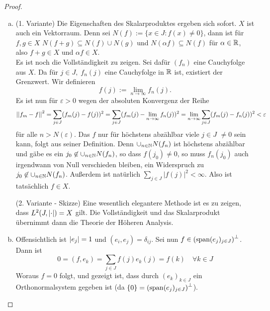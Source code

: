 \documentclass[FunkAnaSkript.tex]{subfiles}
\begin{document}
	\begin{proof}
	\begin{enumerate}[(a)]
		\item 
		(1. Variante)
		Die Eigenschaften des Skalarproduktes ergeben sich sofort. $X$ ist auch ein Vektorraum. Denn sei $N(f) := \{ x \in J : f(x) \not = 0\}$, dann ist für $f,g \in X$ $N(f+g) \subseteq N(f) \cup N(g)$	und $N(\alpha f) \subseteq N(f)$ für $\alpha \in \mathbb{R}$,	also $f+g\in X$ und $\alpha f \in X$. \\
		Es ist noch die Vollständigkeit zu zeigen. Sei dafür $(f_n)$ eine Cauchyfolge aus $X$. Da für $j\in J,\; f_n (j)$ eine Cauchyfolge in $\mathbb{R}$ ist, existiert der Grenzwert. Wir definieren
		$$f(j):=\lim_{n\to\infty} f_n (j).$$
		Es ist nun für $\varepsilon > 0$ wegen der absoluten Konvergenz der Reihe
		$$\left\lvert \left\lvert f_m - f \right\rvert \right\rvert^2 = \sum_{j\in J} (f_m(j)-f(j))^2 = \sum_{j\in J} (f_m(j)-\lim_{n\to\infty} f_n(j))^2 = \lim_{n\to\infty} \sum_{j\in J} (f_m(j)-f_n(j))^2 < \varepsilon$$
		für alle $n > N(\varepsilon)$. Das $f$ nur für höchstens abzählbar viele $j\in J$ $\not = 0$ sein kann, folgt aus seiner Definition. Denn $\cup_{n\in\mathbb{N}} N(f_n)$ ist höchstens abzählbar und gäbe es ein $j_0 \not \in \cup_{n\in\mathbb{N}} N(f_n)$, so dass $f(j_0)\not = 0$, so muss $f_n(j_0)$ auch irgendwann von Null verschieden bleiben, ein Widerspruch zu $j_0 \not \in \cup_{n\in\mathbb{N}} N(f_n)$. Außerdem ist natürlich $\sum_{j\in J} |f(j)|^2 < \infty$. Also ist tatsächlich $f \in X$.\par 
		(2. Variante - Skizze) Eine wesentlich elegantere Methode ist es zu zeigen, dass $L^2(J,\left\lvert \cdot \right\rvert) = X$ gilt. Die Vollständigkeit und das Skalarprodukt übernimmt dann die Theorie der Höheren Analysis.
		
		
		\item Offensichtlich ist $\left\lvert e_j \right\rvert = 1$ und $(e_i, e_j) = \delta_{ij}$. Sei nun $f\in \left( \textnormal{span} (e_j)_{j\in J} \right)^{\perp}$. Dann ist
		$$0 = (f, e_k) = \sum_{j\in J} f(j)e_k(j) = f(k) \quad \forall k\in J$$
		Woraus $f = 0$ folgt, und gezeigt ist, dass durch $(e_k)_{k\in J}$ ein Orthonormalsystem gegeben ist (da $\{0\} = \left( \textnormal{span} (e_j)_{j\in J} \right)^{\perp}$).
		

\end{enumerate}
\end{proof}
\end{document}
